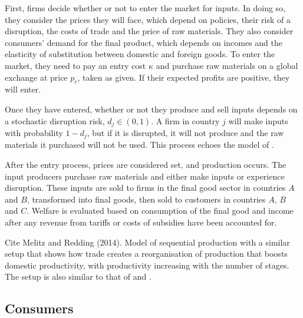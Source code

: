 \documentclass{article}
\begin{document}
First, firms decide whether or not to enter the market for inputs. In doing so, they consider the prices they will face, which depend on policies, their risk of a disruption, the costs of trade and the price of raw materials. They also consider consumers' demand for the final product, which depends on incomes and the elasticity of substitution between domestic and foreign goods. To enter the market, they need to pay an entry cost $\kappa$ and purchase raw materials on a global exchange at price $p_r$, taken as given. If their expected profits are positive, they will enter.

Once they have entered, whether or not they produce and sell inputs depends on a stochastic disruption risk, $d_j \in (0, 1)$. A firm in country $j$ will make inputs with probability $1 - d_j$, but if it is disrupted, it will not produce and the raw materials it purchased will not be used. This process echoes the model of \textcite{bimpikis_supply_2019}.

After the entry process, prices are considered set, and production occurs. The input producers purchase raw materials and either make inputs or experience disruption. These inputs are sold to firms in the final good sector in countries $A$ and $B$, transformed into final goods, then sold to customers in countries $A$, $B$ and $C$. Welfare is evaluated based on consumption of the final good and income after any revenue from tariffs or costs of subsidies have been accounted for.

Cite Melitz and Redding (2014). Model of sequential production with a similar setup that shows how trade creates a reorganisation of production that boosts domestic productivity, with productivity increasing with the number of stages. The setup is also similar to that of \textcite{bagwell_chapter_2016} and \textcite{venables_trade_1987}.

\subsection{Consumers}
 
\end{document}
